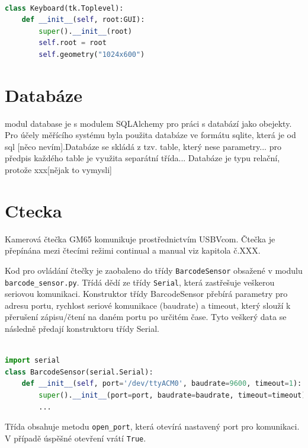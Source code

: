 \begin{lstlisting}[language=Python, caption=Funkce stavového automatu:, frame=single, breaklines=true, postbreak=\mbox{\textcolor{gray}{$\hookrightarrow$}\space}]

class Keyboard(tk.Toplevel):
    def __init__(self, root:GUI):
        super().__init__(root)
        self.root = root
        self.geometry("1024x600")
\end{lstlisting}


\section{Databáze}

modul database je s modulem SQLAlchemy pro práci s databází jako obejekty. Pro účely měřícího systému byla použita databáze ve formátu sqlite, která je od sql [něco nevím].Databáze se skládá z tzv. table, který nese parametry... pro předpis každého table je využita separátní třída... Databáze je typu relační, protože xxx[nějak to vymysli]
%




\section{Ctecka}

Kamerová čtečka GM65 komunikuje prostřednictvím USBVcom. Čtečka je přepínána mezi čtecími režimi continual a manual viz kapitola č.XXX. 

Kod pro ovládání čtečky je zaobaleno do třídy \texttt{BarcodeSensor} obsažené v modulu \texttt{barcode\_sensor.py}. Třídá dědí ze třídy \texttt{Serial}, která zastřešuje veškerou seriovou komunikaci. Konstruktor třídy BarcodeSensor přebírá parametry pro adresu portu, rychlost seriové komunikace (baudrate) a timeout, který slouží k přerušení zápisu/čtení na daném portu po určitém čase. Tyto veškerý data se následně předají konstruktoru třídy Serial. 

\begin{lstlisting}[language=Python,breaklines=true, frame=single,postbreak=\mbox{\tiny$\hookrightarrow$}]

import serial
class BarcodeSensor(serial.Serial):
    def __init__(self, port='/dev/ttyACM0', baudrate=9600, timeout=1):
        super().__init__(port=port, baudrate=baudrate, timeout=timeout)
        ...
\end{lstlisting}
\bigskip
Třída obsahuje metodu \texttt{open\_port}, která otevírá nastavený port pro komunikaci. 
V případě úspěšné otevření vrátí \texttt{True}. 

